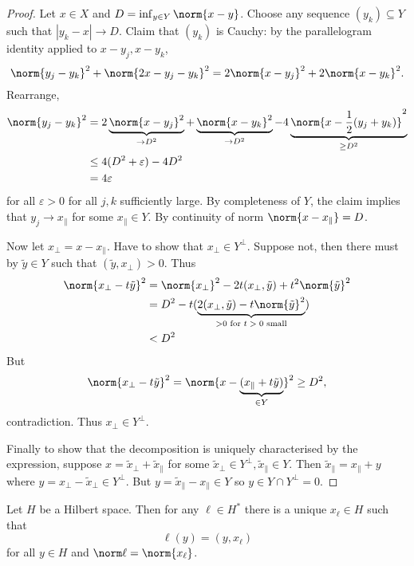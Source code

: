 \documentclass[a4paper]{article}
\begin{document}
\begin{proof}
  Let \(x \in X\) and \(D = \inf_{y \in Y} \norm{x - y}\). Choose any sequence \((y_k) \subseteq Y\) such that \(|y_k - x| \to D\). Claim that \((y_k)\) is Cauchy: by the parallelogram identity applied to \(x - y_j, x - y_k\),
  \[
    \norm{y_j - y_k}^2 + \norm{2x - y_j - y_k}^2 = 2 \norm{x - y_j}^2 + 2 \norm{x - y_k}^2.
  \]
  Rearrange,
  \begin{align*}
    \norm{y_j - y_k}^2
    &= 2 \underbrace{\norm{x - y_j}^2}_{\to D^2} + \underbrace{\norm{x - y_k}^2}_{\to D^2} - 4 \underbrace{\norm{x - \frac{1}{2}(y_j + y_k)}^2}_{\geq D^2} \\
    &\leq 4(D^2 + \varepsilon) - 4D^2 \\
    &= 4\varepsilon
  \end{align*}
  for all \(\varepsilon > 0\) for all \(j, k\) sufficiently large. By completeness of \(Y\), the claim implies that \(y_j \to x_\parallel\) for some \(x_\parallel \in Y\). By continuity of norm \(\norm{x - x_\parallel} = D\).

  Now let \(x_\perp = x - x_\parallel\). Have to show that \(x_\perp \in Y^\perp\). Suppose not, then there must by \(\tilde y \in Y\) such that \((\tilde y, x_\perp) > 0\). Thus
  \begin{align*}
    \norm{x_\perp - t \tilde y}^2
    &= \norm{x_\perp}^2 - 2t(x_\perp, \tilde y) + t^2 \norm{\tilde y}^2 \\
    &= D^2 - t(\underbrace{2(x_\perp, \tilde y) - t\norm{\tilde y}^2}_{> 0 \text{ for \(t > 0\) small}}) \\
    &< D^2
  \end{align*}
  But
  \[
    \norm{x_\perp - t\tilde y}^2
    = \norm{x - \underbrace{(x_\parallel + t \tilde y)}_{\in Y}}^2
    \geq D^2,
  \]
  contradiction. Thus \(x_\perp \in Y^\perp\).

  Finally to show that the decomposition is uniquely characterised by the expression, suppose \(x = \tilde x_\perp + \tilde x_\parallel\) for some \(\tilde x_\perp \in Y^\perp, \tilde x_\parallel \in Y\). Then \(\tilde x_\parallel = x_\parallel + y\) where \(y = x_\perp - \tilde x_\perp \in Y^\perp\). But \(y = \tilde x_\parallel - x_\parallel \in Y\) so \(y \in Y \cap Y^\perp = 0\).
\end{proof}

\begin{theorem}
  Let \(H\) be a Hilbert space. Then for any \(\ell \in H^*\) there is a unique \(x_\ell \in H\) such that
  \[
    \ell(y) = (y, x_\ell)
  \]
  for all \(y \in H\) and \(\norm \ell = \norm{x_\ell}\).
\end{theorem}
\end{document}

